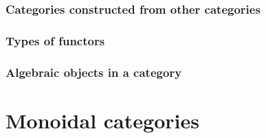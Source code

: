 \subsubsection{Categories constructed from other categories}












\subsubsection{Types of functors}







\subsubsection{Algebraic objects in a category}


















\section{Monoidal categories}

